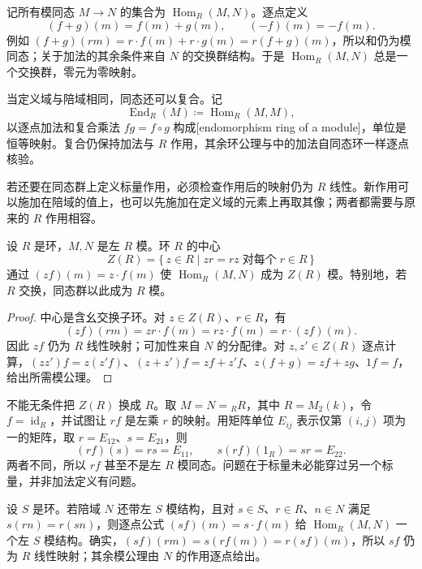 记所有模同态 \(M\to N\) 的集合为 \(\operatorname{Hom}_R(M,N)\)。逐点定义
\[
	(f+g)(m)=f(m)+g(m),\qquad (-f)(m)=-f(m).
\]
例如 \((f+g)(rm)=r\cdot f(m)+r\cdot g(m)=r(f+g)(m)\)，所以和仍为模同态；关于加法的其余条件来自 \(N\) 的交换群结构。于是 \(\operatorname{Hom}_R(M,N)\) 总是一个交换群，零元为零映射。

当定义域与陪域相同，同态还可以复合。记
\[
	\operatorname{End}_R(M)\coloneqq\operatorname{Hom}_R(M,M),
\]
以逐点加法和复合乘法 \(fg=f\circ g\) 构成[endomorphism ring of a module]，单位是恒等映射。复合仍保持加法与 \(R\) 作用，其余环公理与中的加法自同态环一样逐点核验。

若还要在同态群上定义标量作用，必须检查作用后的映射仍为 \(R\) 线性。新作用可以施加在陪域的值上，也可以先施加在定义域的元素上再取其像；两者都需要与原来的 \(R\) 作用相容。

\begin{proposition}\label{b2:prop:hom-central-action}
	设 \(R\) 是环，\(M,N\) 是左 \(R\) 模。环 \(R\) 的中心
	\[
		Z(R)=\{\,z\in R\mid zr=rz\;\text{对每个}\;r\in R\,\}
	\]
	通过 \((zf)(m)=z\cdot f(m)\) 使 \(\operatorname{Hom}_R(M,N)\) 成为 \(Z(R)\) 模。特别地，若 \(R\) 交换，同态群以此成为 \(R\) 模。
\end{proposition}
\begin{proof}
	中心是含幺交换子环。对 \(z\in Z(R)\)、\(r\in R\)，有
	\[
		(zf)(rm)=zr\cdot f(m)=rz\cdot f(m)=r\cdot(zf)(m).
	\]
	因此 \(zf\) 仍为 \(R\) 线性映射；可加性来自 \(N\) 的分配律。对 \(z,z'\in Z(R)\) 逐点计算，\((zz')f=z(z'f)\)、\((z+z')f=zf+z'f\)、\(z(f+g)=zf+zg\)、\(1f=f\)，给出所需模公理。
\end{proof}

不能无条件把 \(Z(R)\) 换成 \(R\)。取 \(M=N={}_RR\)，其中 \(R=M_2(k)\)，令 \(f=\operatorname{id}_R\)，并试图让 \(rf\) 是左乘 \(r\) 的映射。用矩阵单位 \(E_{ij}\) 表示仅第 \((i,j)\) 项为一的矩阵，取 \(r=E_{12}\)、\(s=E_{21}\)，则
\[
	(rf)(s)=rs=E_{11},\qquad s(rf)(1_R)=sr=E_{22}.
\]
两者不同，所以 \(rf\) 甚至不是左 \(R\) 模同态。问题在于标量未必能穿过另一个标量，并非加法定义有问题。

\ProseParagraphBreak
设 \(S\) 是环。若陪域 \(N\) 还带左 \(S\) 模结构，且对 \(s\in S\)、\(r\in R\)、\(n\in N\) 满足 \(s(rn)=r(sn)\)，则逐点公式 \((sf)(m)=s\cdot f(m)\) 给 \(\operatorname{Hom}_R(M,N)\) 一个左 \(S\) 模结构。确实，\((sf)(rm)=s(rf(m))=r(sf)(m)\)，所以 \(sf\) 仍为 \(R\) 线性映射；其余模公理由 \(N\) 的作用逐点给出。

